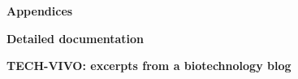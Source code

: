 \documentclass{report}
\begin{document}
\begin{outline}
\begin{outline}
  \end{outline}
  \item {\bf Appendices}
  \begin{outline}
    \item {\bf Detailed documentation } \\
    \item {\bf TECH-VIVO: excerpts from a biotechnology blog } \\
      
  \end{outline}
\end{outline}
\end{document}
